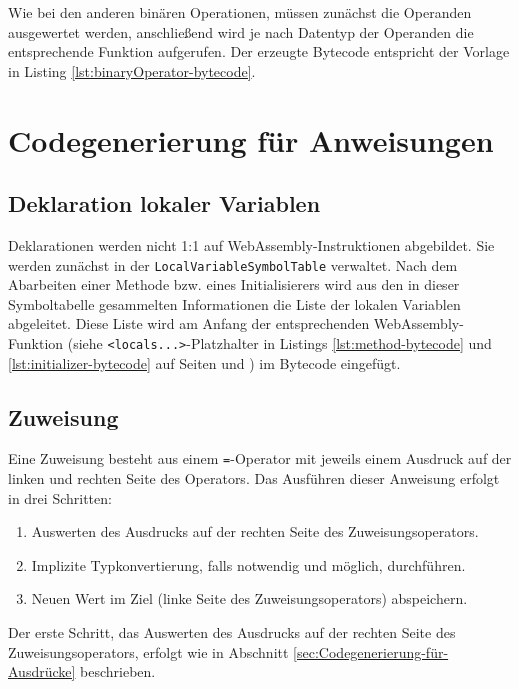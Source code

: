 Wie bei den anderen binären Operationen, müssen zunächst die Operanden ausgewertet werden, anschließend wird je nach Datentyp der Operanden die entsprechende Funktion aufgerufen. Der erzeugte Bytecode entspricht der Vorlage in Listing \ref{lst:binaryOperator-bytecode}.



\section{Codegenerierung für Anweisungen}

\subsection{Deklaration lokaler Variablen}

Deklarationen werden nicht 1:1 auf WebAssembly-Instruktionen abgebildet. Sie werden zunächst in der \lstinline{LocalVariableSymbolTable} verwaltet. Nach dem Abarbeiten einer Methode bzw. eines Initialisierers wird aus den in dieser Symboltabelle gesammelten Informationen die Liste der lokalen Variablen abgeleitet. Diese Liste wird am Anfang der entsprechenden WebAssembly-Funktion (siehe \lstinline{<locals...>}-Platzhalter in Listings \ref{lst:method-bytecode} und \ref{lst:initializer-bytecode} auf Seiten \pageref{lst:method-bytecode} und \pageref{lst:initializer-bytecode}) im Bytecode eingefügt.

\subsection{Zuweisung}
Eine Zuweisung besteht aus einem \lstinline{=}-Operator mit jeweils einem Ausdruck auf der linken und rechten Seite des Operators. Das Ausführen dieser Anweisung erfolgt in drei Schritten:
\begin{enumerate}
    \item Auswerten des Ausdrucks auf der rechten Seite des Zuweisungsoperators.
    \item Implizite Typkonvertierung, falls notwendig und möglich, durchführen.
    \item Neuen Wert im Ziel (linke Seite des Zuweisungsoperators) abspeichern.
\end{enumerate}

Der erste Schritt, das Auswerten des Ausdrucks auf der rechten Seite des Zuweisungsoperators, erfolgt wie in Abschnitt \ref{sec:Codegenerierung-für-Ausdrücke} beschrieben.

